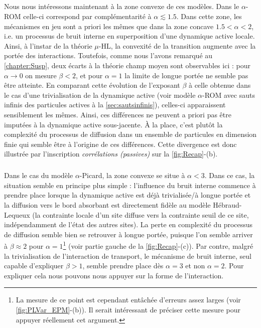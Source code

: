 \subparagraph{}Nous nous intéressons maintenant à la zone convexe de ces modèles. Dans le $\alpha$-ROM celle-ci correspond par complémentarité à $\alpha\lesssim 1.5$. Dans cette zone, les mécanismes en jeu sont a priori les mêmes que dans la zone concave $1.5 < \alpha < 2$, i.e. un processus de bruit interne en superposition d'une dynamique active locale. Ainsi, à l'instar de la théorie $\mu$-HL, la convexité de la transition augmente avec la portée des interactions. Toutefois, comme nous l'avons remarqué au \autoref{chapter:Susp}, deux écarts à la théorie champ moyen sont observables ici : pour $\alpha \rightarrow 0$ on mesure $\beta < 2$, et pour $\alpha = 1$ la limite de longue portée ne semble pas être atteinte. En comparant cette évolution de l'exposant $\beta$ à celle obtenue dans le cas d'une trivialisation de la dynamique active (voir modèle $\alpha$-ROM avec sauts infinis des particules actives à la \autoref{sec:sautsinfinis}), celles-ci apparaissent sensiblement les mêmes. Ainsi, ces différences ne peuvent a priori pas être imputées à la dynamique active sous-jacente. \`A la place, c'est plutôt la complexité du processus de diffusion dans un ensemble de particules en dimension finie qui semble être à l'origine de ces différences. Cette divergence est donc illustrée par l'inscription \textit{corrélations (passives)} sur la \autoref{fig:Recap}-(b).

\subparagraph{}Dans le cas du modèle $\alpha$-Picard, la zone convexe se situe à $\alpha < 3$. Dans ce cas, la situation semble en principe plus simple : l'influence du bruit interne commence à prendre place lorsque la dynamique active est déjà trivialisée/à longue portée et la diffusion vers le bord absorbant est directement fidèle au modèle Hébraud-Lequeux (la contrainte locale d'un site diffuse vers la contrainte seuil de ce site, indépendamment de l'état des autres sites). La perte en complexité du processus de diffusion semble bien se retrouver à longue portée, puisque l'on semble arriver à $\beta \approx 2$ pour $\alpha = 1$\footnote{La mesure de ce point est cependant entâchée d'erreurs assez larges (voir \autoref{fig:PLVar_EPM}-(b)). Il serait intéressant de préciser cette mesure pour appuyer réellement cet argument.} (voir partie gauche de la \autoref{fig:Recap}-(c)). Par contre, malgré la trivialisation de l'interaction de transport, le mécanisme de bruit interne, seul capable d'expliquer $\beta >1$, semble prendre place dès $\alpha=3$ et non $\alpha = 2$. Pour expliquer cela nous pouvons nous appuyer sur la forme de l'interaction.

